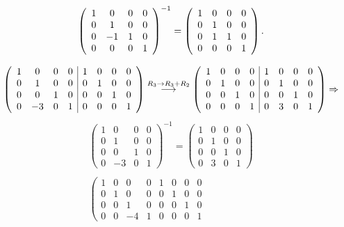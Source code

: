 \documentclass[11pt,letterpaper]{article}
\newcommand{\grstep}[2][\relax]{%
   \ensuremath{\mathrel{
       {\mathop{\longrightarrow}\limits^{#2\mathstrut}_{
                                     \begin{subarray}{l} #1 \end{subarray}}}}}}
\begin{document}
\begin{enumerate}
\begin{equation*}
 \begin{array}{c}
\left(\begin{array}{cccc}
1&0&0&0\\
0&1&0&0\\
0&-1&1&0\\
0&0&0&1
\end{array} \right)^{-1}= \left(\begin{array}{cccc}
1&0&0&0\\
0&1&0&0\\
0&1&1&0\\
0&0&0&1
\end{array} \right).\\ \\
\left(\begin{array}{cccc|cccc}
1&0&0&0&1&0&0&0\\
0&1&0&0&0&1&0&0\\
0&0&1&0&0&0&1&0\\
0&-3&0&1&0&0&0&1
\end{array} \right)%
\grstep[]{R_3 \rightarrow R_3+R_2}
% 
\left(\begin{array}{cccc|cccc}
1&0&0&0&1&0&0&0\\
0&1&0&0&0&1&0&0\\
0&0&1&0&0&0&1&0\\
0&0&0&1&0&3&0&1
\end{array} \right)\Rightarrow 
\end{array}
\end{equation*}
\begin{equation*}
\begin{array}{c}
\left(\begin{array}{cccc}
1&0&0&0\\
0&1&0&0\\
0&0&1&0\\
0&-3&0&1
\end{array} \right)^{-1}=\left(\begin{array}{cccc}
1&0&0&0\\
0&1&0&0\\
0&0&1&0\\
0&3&0&1
\end{array} \right)\\ \\
\left(\begin{array}{cccc|cccc}
1&0&0&0&1&0&0&0\\
0&1&0&0&0&1&0&0\\
0&0&1&0&0&0&1&0\\
0&0&-4&1&0&0&0&1

\end{array}
\end{array}
\end{equation*}
\end{enumerate}
\end{document}
